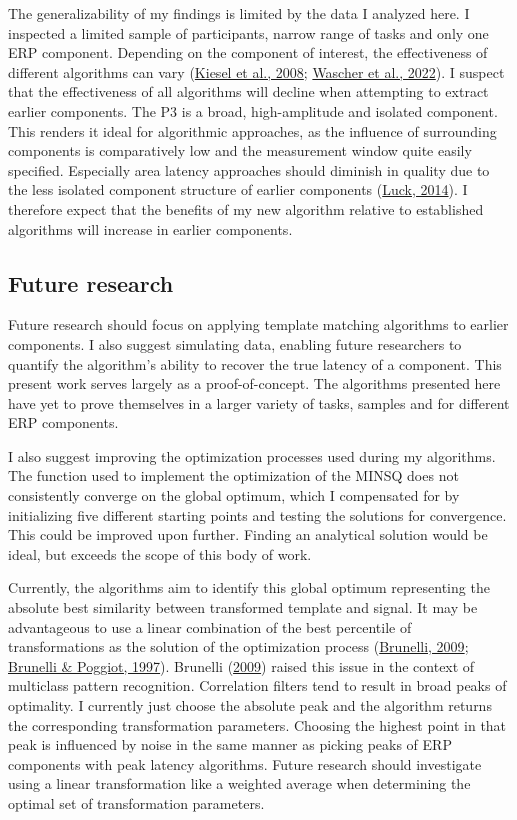 \documentclass[
  man]{apa7}
\begin{document}
The generalizability of my findings is limited by the data I analyzed here. I inspected a limited sample of participants, narrow range of tasks and only one ERP component. Depending on the component of interest, the effectiveness of different algorithms can vary (\protect\hyperlink{ref-kiesel2008measurement}{Kiesel et al., 2008}; \protect\hyperlink{ref-wascher2022mental}{Wascher et al., 2022}). I suspect that the effectiveness of all algorithms will decline when attempting to extract earlier components. The P3 is a broad, high-amplitude and isolated component. This renders it ideal for algorithmic approaches, as the influence of surrounding components is comparatively low and the measurement window quite easily specified. Especially area latency approaches should diminish in quality due to the less isolated component structure of earlier components (\protect\hyperlink{ref-luck2014introduction}{Luck, 2014}). I therefore expect that the benefits of my new algorithm relative to established algorithms will increase in earlier components.

\hypertarget{future-research}{%
\subsection{Future research}\label{future-research}}

Future research should focus on applying template matching algorithms to earlier components. I also suggest simulating data, enabling future researchers to quantify the algorithm's ability to recover the true latency of a component. This present work serves largely as a proof-of-concept. The algorithms presented here have yet to prove themselves in a larger variety of tasks, samples and for different ERP components.

I also suggest improving the optimization processes used during my algorithms. The function used to implement the optimization of the MINSQ does not consistently converge on the global optimum, which I compensated for by initializing five different starting points and testing the solutions for convergence. This could be improved upon further. Finding an analytical solution would be ideal, but exceeds the scope of this body of work.

Currently, the algorithms aim to identify this global optimum representing the absolute best similarity between transformed template and signal. It may be advantageous to use a linear combination of the best percentile of transformations as the solution of the optimization process (\protect\hyperlink{ref-brunelli2009template}{Brunelli, 2009}; \protect\hyperlink{ref-brunelli1997template}{Brunelli \& Poggiot, 1997}). Brunelli (\protect\hyperlink{ref-brunelli2009template}{2009}) raised this issue in the context of multiclass pattern recognition. Correlation filters tend to result in broad peaks of optimality. I currently just choose the absolute peak and the algorithm returns the corresponding transformation parameters. Choosing the highest point in that peak is influenced by noise in the same manner as picking peaks of ERP components with peak latency algorithms. Future research should investigate using a linear transformation like a weighted average when determining the optimal set of transformation parameters.
\end{document}
